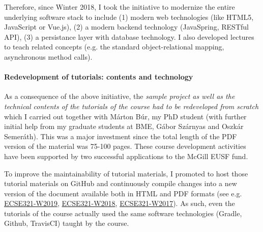Therefore, since Winter 2018, I took the initiative to modernize the entire underlying software stack to include (1) modern web technologies (like HTML5, JavaScript or Vue.js), (2) a modern backend technology (JavaSpring, RESTful API), (3) a persistance layer with database technology. I also developed lectures to teach related concepts (e.g. the standard object-relational mapping, asynchronous method calls).

\paragraph{Redevelopment of tutorials: contents and technology}
As a consequence of the above initiative, the \emph{sample project as well as the technical contents of the tutorials of the course had to be redeveloped from scratch} which I carried out together with Márton Búr, my PhD student (with further initial help from my graduate students at BME, Gábor Szárnyas and Oszkár Semeráth). This was a major investment since the total length of the PDF version of the material was 75-100 pages. These course development activities have been supported by two successful applications to the McGill EUSF fund. 

To improve the maintainability of tutorial materials, I promoted to host those tutorial materials on GitHub and continuously compile changes into a new version of the document available both in HTML and PDF formats (see e.g. 
\href{https://mcgill-ecse321-winter2019.github.io/EventRegistration-Tutorials/}{ECSE321-W2019}, 
\href{https://mcgill-ecse321-winter2018.github.io/EventRegistration-Tutorials/}{ECSE321-W2018}, 
\href{https://ecse321-winter2017-mcgill.github.io/EventRegistration-Tutorials/}{ECSE321-W2017}). As such, even the tutorials of the course actually used the same software technologies (Gradle, Github, TravisCI) taught by the course. 



